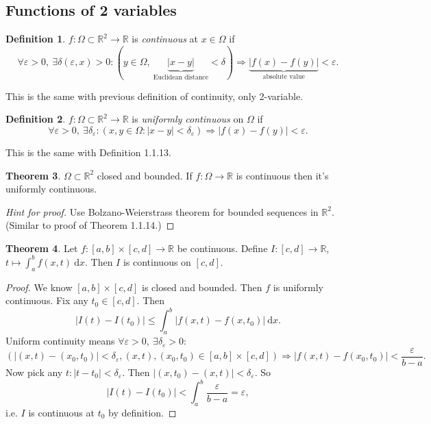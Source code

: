 \documentclass[a4paper]{article}
\theoremstyle{definition}
\newtheorem{defn}{Definition}[subsection]
\newtheorem{thm}[defn]{Theorem}
\begin{document}
\subsection{Functions of 2 variables}
\begin{defn}
$f:\Omega \subset \mathbb R^2 \rightarrow \mathbb R$ is \textit{continuous} at $x\in \Omega$ if
\[
\forall \varepsilon >0,\ \exists \delta(\varepsilon ,x)>0: (y\in \Omega,\ \underbrace{|x-y|}_{\text{Euclidean distance}}<\delta ) \Rightarrow \underbrace{|f(x)-f(y)|}_{\text{absolute value}}<\varepsilon .
\]
\end{defn}
This is the same with previous definition of continuity, only 2-variable.
\begin{defn}
$f:\Omega \subset \mathbb R^2 \rightarrow \mathbb R$ is \textit{uniformly continuous} on $\Omega$ if
\[
\forall \varepsilon >0,\ \exists \delta_\varepsilon : (x,y\in \Omega: |x-y|<\delta_\varepsilon) \Rightarrow |f(x)-f(y)|<\varepsilon .
\]
\end{defn}
This is the same with Definition 1.1.13.
\begin{thm}
$\Omega \subset \mathbb R^2$ closed and bounded. If $f:\Omega \rightarrow \mathbb R$ is continuous then it's uniformly continuous.
\end{thm}
\begin{proof}[Hint for proof]
Use Bolzano-Weierstrass theorem for bounded sequences in $\mathbb R^2$. (Similar to proof of Theorem 1.1.14.)
\end{proof}
\begin{thm}
Let $f:[a,b]\times [c,d]\rightarrow \mathbb R$ be continuous. Define $I:[c,d] \rightarrow \mathbb R$, $t\mapsto \int_a^b  f(x,t) \ \mathrm d x.$ Then $I$ is continuous on $[c,d]$.
\end{thm}
\begin{proof}
We know $[a,b]\times [c,d]$ is closed and bounded. Then $f$ is uniformly continuous. Fix any $t_0\in [c,d]$. Then
\[
|I(t)-I(t_0)|\leq \int_a^b |f(x,t)-f(x,t_0)| \ \mathrm d x .
\]
Uniform continuity means $\forall \varepsilon >0,\ \exists \delta_\varepsilon >0 : $
\[
(|(x,t)-(x_0,t_0)|<\delta_\varepsilon, (x,t),(x_0,t_0)\in [a,b]\times [c,d])\Rightarrow |f(x,t)-f(x_0,t_0)| <\frac{\varepsilon}{b-a} .
\]
Now pick any $t:|t-t_0|<\delta_\varepsilon$. Then $|(x,t_0)-(x,t)|<\delta_\varepsilon$. So
\[
|I(t)-I(t_0)| < \int_a^b \frac{\varepsilon}{b-a}=\varepsilon,
\]
i.e. $I$ is continuous at $t_0$ by definition.
\end{proof}
\end{document}
